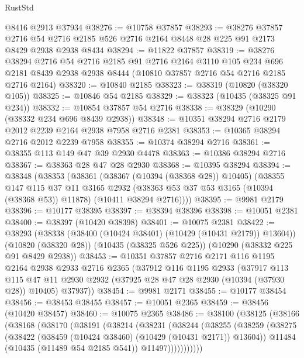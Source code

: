\begin{lexlean}{RustStd}
\begin{coremodule}
    @8416
    @2913
    @37934
@38276 := @10758 @37857
@38293 := @38276
    @37857
    @2716
    @54
    @2716
    @2185
    @526
    @2716
    @2164
    @8448
    @28
    @225
    @91
    @2173
    @8429
    @2938
    @2938
    @8434
@38294 := @11822 @37857
@38319 := @38276
    @38294
    @2716
    @54
    @2716
    @2185
    @91
    @2716
    @2164
    @3110
    @105
    @234
    @696
    @2181
    @8439
    @2938
    @2938
    @8444
    (@10810 @37857 @2716 @54 @2716 @2185 @2716 @2164)
@38320 := @10840 @2185
@38323 := @38319 (@10820 (@38320 @105))
@38325 := @10846 @54 @2185
@38329 := @38323 (@10435 (@38325 @91 @234))
@38332 := @10854 @37857 @54 @2716
@38338 := @38329 (@10290 (@38332 @234 @696 @8439 @2938))
@38348 := @10351 @38294 @2716 @2179 @2012 @2239 @2164 @2938 @7958 @2716 @2381
@38353 := @10365 @38294 @2716 @2012 @2239 @7958
@38355 := @10374 @38294 @2716
@38361 := @38355 @113 @149 @47 @39 @2930 @4478
@38363 := @10386 @38294 @2716
@38367 := @38363 @28 @47 @28 @2930
@38368 := @10395 @38294
@38394 := @38348
    (@38353
      (@38361
        (@38367 (@10394 (@38368 @28)) @10405)
        (@38355
          @147
          @115
          @37
          @11
          @3165
          @2932
          (@38363 @53 @37 @53 @3165 (@10394 (@38368 @53)) @11878)
          (@10411 @38294 @2716))))
@38395 := @9981 @2179
@38396 := @10177 @38395
@38397 := @38394 @38396
@38398 := @10051 @2381
@38400 := @38397 (@10420 @38398)
@38401 := @10075 @2381
@38422 := @38293
    (@38338 (@38400 (@10424 @38401) (@10429 (@10431 @2179)) @13604))
    (@10820 (@38320 @28))
    (@10435 (@38325 @526 @225))
    (@10290 (@38332 @225 @91 @8429 @2938))
@38453 := @10351
    @37857
    @2716
    @2171
    @116
    @1195
    @2164
    @2938
    @2933
    @2716
    @2365
    (@37912
      @116
      @1195
      @2933
      (@37917
        @113
        @115
        @47
        @11
        @2930
        @2932
        (@37925 @28 @47 @28 @2930 (@10394 (@37930 @28)) @10405)
        @37937))
@38454 := @9981 @2171
@38455 := @10177 @38454
@38456 := @38453 @38455
@38457 := @10051 @2365
@38459 := @38456 (@10420 @38457)
@38460 := @10075 @2365
@38486 := @38100
    (@38125
      (@38166
        (@38168
          (@38170
            (@38191
              (@38214
                (@38231
                  (@38244
                    (@38255
                      (@38259
                        (@38275
                          (@38422 (@38459 (@10424 @38460) (@10429 (@10431 @2171)) @13604))
                          @11484
                          (@10435 (@11489 @54 @2185 @541))
                          @11497)))))))))))

\end{coremodule}
\end{lexlean}
